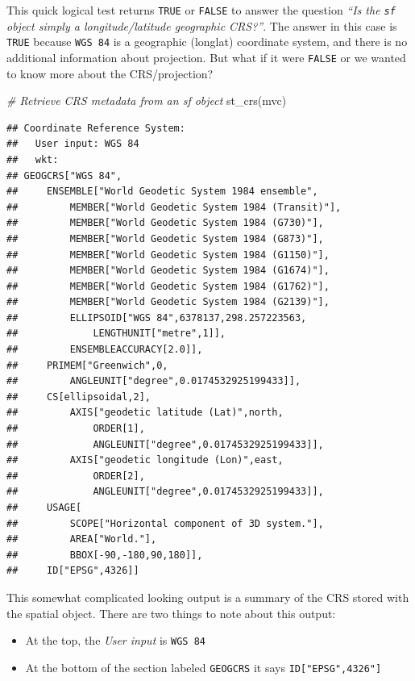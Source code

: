 \documentclass[
]{book}
\newenvironment{Shaded}{\begin{snugshade}}{\end{snugshade}}
\newcommand{\CommentTok}[1]{\textcolor[rgb]{0.56,0.35,0.01}{\textit{#1}}}
\newcommand{\FunctionTok}[1]{\textcolor[rgb]{0.00,0.00,0.00}{#1}}
\newcommand{\NormalTok}[1]{#1}
\providecommand{\tightlist}{%
  \setlength{\itemsep}{0pt}\setlength{\parskip}{0pt}}
\begin{document}
This quick logical test returns \texttt{TRUE} or \texttt{FALSE} to answer the question \emph{``Is the \texttt{sf} object simply a longitude/latitude geographic CRS?''}. The answer in this case is \texttt{TRUE} because \texttt{WGS\ 84} is a geographic (longlat) coordinate system, and there is no additional information about projection. But what if it were \texttt{FALSE} or we wanted to know more about the CRS/projection?

\begin{Shaded}
\begin{Highlighting}[]
\CommentTok{\# Retrieve CRS metadata from an sf object}
\FunctionTok{st\_crs}\NormalTok{(mvc)}
\end{Highlighting}
\end{Shaded}

\begin{verbatim}
## Coordinate Reference System:
##   User input: WGS 84 
##   wkt:
## GEOGCRS["WGS 84",
##     ENSEMBLE["World Geodetic System 1984 ensemble",
##         MEMBER["World Geodetic System 1984 (Transit)"],
##         MEMBER["World Geodetic System 1984 (G730)"],
##         MEMBER["World Geodetic System 1984 (G873)"],
##         MEMBER["World Geodetic System 1984 (G1150)"],
##         MEMBER["World Geodetic System 1984 (G1674)"],
##         MEMBER["World Geodetic System 1984 (G1762)"],
##         MEMBER["World Geodetic System 1984 (G2139)"],
##         ELLIPSOID["WGS 84",6378137,298.257223563,
##             LENGTHUNIT["metre",1]],
##         ENSEMBLEACCURACY[2.0]],
##     PRIMEM["Greenwich",0,
##         ANGLEUNIT["degree",0.0174532925199433]],
##     CS[ellipsoidal,2],
##         AXIS["geodetic latitude (Lat)",north,
##             ORDER[1],
##             ANGLEUNIT["degree",0.0174532925199433]],
##         AXIS["geodetic longitude (Lon)",east,
##             ORDER[2],
##             ANGLEUNIT["degree",0.0174532925199433]],
##     USAGE[
##         SCOPE["Horizontal component of 3D system."],
##         AREA["World."],
##         BBOX[-90,-180,90,180]],
##     ID["EPSG",4326]]
\end{verbatim}

This somewhat complicated looking output is a summary of the CRS stored with the spatial object. There are two things to note about this output:

\begin{itemize}
\tightlist
\item
  At the top, the \emph{User input} is \texttt{WGS\ 84}
\item
  At the bottom of the section labeled \texttt{GEOGCRS} it says \texttt{ID{[}"EPSG",4326"{]}}
\end{itemize}
\end{document}
